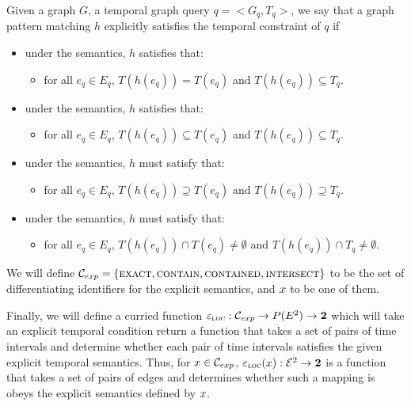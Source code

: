 \begin{defn}
\label{explicit-temp-semantics}
Given a graph $G$, a temporal graph query $q= <G_q, T_q>$, we say that a graph
pattern matching $h$ explicitly satisfies the temporal constraint of $q$ if
\begin{itemize}
	\item under the \exact{} semantics, $h$ satisfies that:
	\begin{itemize}
		\item for all $e_q \in E_q$, $T(h(e_q)) = T(e_q)$ and $T(h(e_q))
                  \subseteq T_q$.
	\end{itemize}

	\item under the \contain{} semantics, $h$ satisfies that:
	\begin{itemize}
		\item for all $e_q \in E_q$, $T(h(e_q)) \subseteq T(e_q)$ and
                  $T(h(e_q)) \subseteq T_q$.
	\end{itemize}

	\item under the \contained{} semantics, $h$ must satisfy that:
	\begin{itemize}
		\item for all $e_q \in E_q$, $T(h(e_q)) \supseteq T(e_q)$ and
                  $T(h(e_q)) \supseteq T_q$.
	\end{itemize}

	\item under the \intersection{} semantics, $h$ must satisfy that:
	\begin{itemize}
		\item for all $e_q \in E_q$, $T(h(e_q)) \cap T(e_q) \not=
                  \emptyset $ and $T(h(e_q)) \cap T_q \not= \emptyset$.
	\end{itemize}
\end{itemize}



  We will define $\mathcal{C}_{exp} = \{\textsc{exact}, \textsc{contain}, \textsc{contained}, \textsc{intersect}\}$ to
  be the set of differentiating identifiers for the explicit semantics, and
  $x$ to be one of them.

  Finally, we will define a curried function $\varepsilon_{\textsc{loc}} : \mathcal{C}_{exp} \to P(E^2) \to
  \textbf{2}$ which will take an explicit temporal condition return a function
  that takes a set of pairs of time intervals and determine whether each pair of
  time intervals satisfies the given explicit temporal semantics. Thus, for
  $x \in \mathcal{C}_{exp}$, $\varepsilon_{\textsc{loc}}(x) : \mathcal{E}^2 \to \textbf{2}$ is a function
  that takes a set of pairs of edges and determines whether such a mapping is
  obeys the explicit semantics defined by $x$.

\end{defn}

